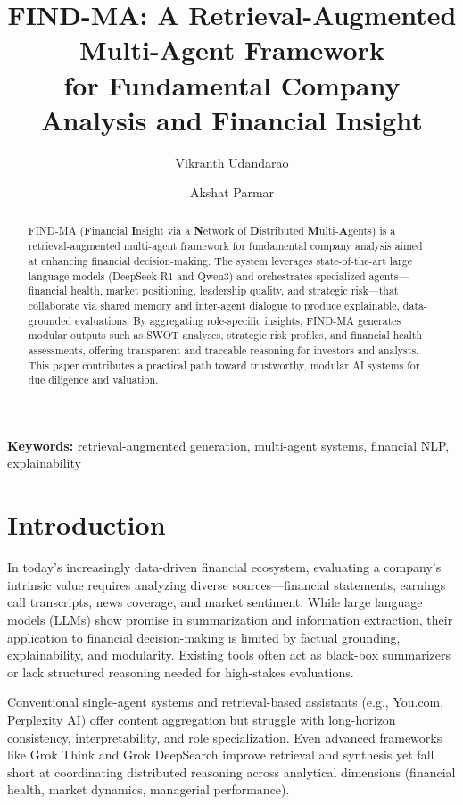 \documentclass[11pt]{article}
\title{FIND-MA: A Retrieval-Augmented Multi-Agent Framework\\
for Fundamental Company Analysis and Financial Insight}
\author[1]{Vikranth Udandarao}
\author[1]{Akshat Parmar}
\affil[1]{IIIT Delhi, India}
\affil[ ]{\texttt{\{vikranth22570, akshat22050\}@iiitd.ac.in}}
\date{} %
\newcommand{\findma}{\textsc{FIND-MA}}
\begin{document}
\maketitle

\begin{abstract}
\findma{} (\textbf{F}inancial \textbf{I}nsight via a \textbf{N}etwork of \textbf{D}istributed \textbf{M}ulti-\textbf{A}gents) is a retrieval-augmented multi-agent framework for fundamental company analysis aimed at enhancing financial decision-making. The system leverages state-of-the-art large language models (DeepSeek-R1 and Qwen3) and orchestrates specialized agents---financial health, market positioning, leadership quality, and strategic risk---that collaborate via shared memory and inter-agent dialogue to produce explainable, data-grounded evaluations. By aggregating role-specific insights, \findma{} generates modular outputs such as SWOT analyses, strategic risk profiles, and financial health assessments, offering transparent and traceable reasoning for investors and analysts. This paper contributes a practical path toward trustworthy, modular AI systems for due diligence and valuation.
\end{abstract}

\textbf{Keywords:} retrieval-augmented generation, multi-agent systems, financial NLP, explainability

\section{Introduction}
\label{sec:intro}
In today’s increasingly data-driven financial ecosystem, evaluating a company’s intrinsic value requires analyzing diverse sources---financial statements, earnings call transcripts, news coverage, and market sentiment. While large language models (LLMs) show promise in summarization and information extraction, their application to financial decision-making is limited by factual grounding, explainability, and modularity. Existing tools often act as black-box summarizers or lack structured reasoning needed for high-stakes evaluations.

Conventional single-agent systems and retrieval-based assistants (e.g., You.com, Perplexity AI) offer content aggregation but struggle with long-horizon consistency, interpretability, and role specialization. Even advanced frameworks like Grok Think and Grok DeepSearch improve retrieval and synthesis yet fall short at coordinating distributed reasoning across analytical dimensions (financial health, market dynamics, managerial performance).
\end{document}
